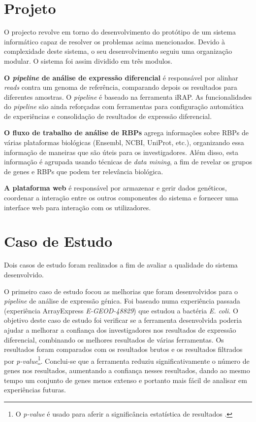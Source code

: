 \documentclass[9pt,a4paper]{extarticle}
\begin{document}
\begin{multicols}{2}
\section{Projeto} \label{sec:project}

O projecto revolve em torno do desenvolvimento do protótipo de um sistema
informático capaz de resolver os problemas acima mencionados. Devido à
complexidade deste sistema, o seu desenvolvimento seguiu uma organização
modular. O sistema foi assim dividido em três modulos.

  \textbf{O \emph{pipeline} de análise de expressão diferencial} é responsável
  por alinhar \emph{reads} contra um genoma de referência, comparando depois os
  resultados para diferentes amostras. O \emph{pipeline} é baseado na ferramenta
  iRAP. As funcionalidades do \emph{pipeline} são ainda reforçadas com
  ferramentas para configuração automática de experiências e consolidação de
  resultados de expressão diferencial.

  \textbf{O fluxo de trabalho de análise de RBPs} agrega informações sobre RBPs
  de várias plataformas biológicas (Ensembl, NCBI, UniProt, etc.), organizando
  essa informação de maneiras que são úteis para os investigadores. Além disso,
  esta informação é agrupada usando técnicas de \emph{data mining}, a fim de
  revelar os grupos de genes e RBPs que podem ter relevância biológica.

  \textbf{A plataforma web} é responsável por armazenar e gerir dados genéticos,
  coordenar a interação entre os outros componentes do sistema e fornecer uma
  interface web para interação com os utilizadores.

\section{Caso de Estudo}

Dois casos de estudo foram realizados a fim de avaliar a qualidade do sistema
desenvolvido.

O primeiro caso de estudo focou as melhorias que foram desenvolvidos para o
\emph{pipeline} de análise de expressão génica. Foi baseado numa experiência
passada (experiência ArrayExpress \emph{E-GEOD-48829}) que estudou a bactéria
\emph{E. coli}. O objetivo deste caso de estudo foi verificar se a ferramenta
desenvolvida poderia ajudar a melhorar a confiança dos investigadores nos
resultados de expressão diferencial, combinando os melhores resultados de várias
ferramentas. Os resultados foram comparados com os resultados brutos e os
resultados filtrados por \emph{p-value}\footnote{O \emph{p-value} é usado para
aferir a significância estatística de resultados \cite{goodman45dirty}.}.
Conclui-se que a ferramenta reduziu significativamente o número de genes nos
resultados, aumentando a confiança nesses resultados, dando ao mesmo tempo um
conjunto de genes menos extenso e portanto mais fácil de analisar em
experiências futuras.


\end{multicols}
\end{document}
